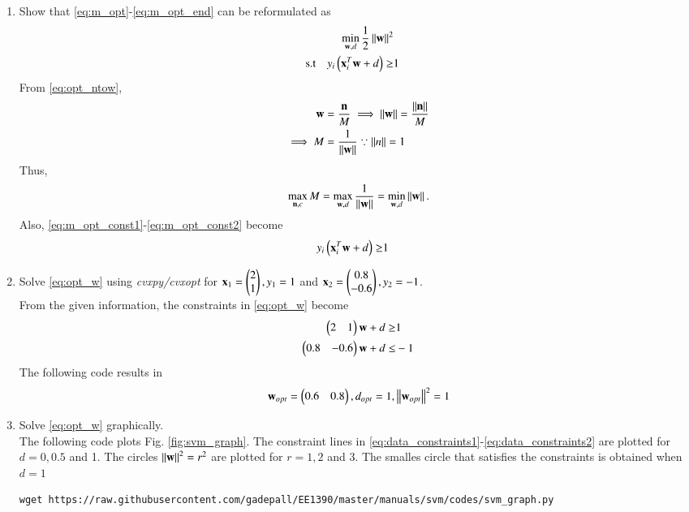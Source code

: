 \documentclass[journal,12pt,twocolumn]{IEEEtran}
\renewcommand\thesection{\arabic{section}}
\begin{document}
\begin{enumerate}[label=\thesection.\arabic*,ref=\thesection.\theenumi]
\item Show that \eqref{eq:m_opt}-\eqref{eq:m_opt_end} can be reformulated as
%
\begin{align}
\label{eq:opt_w}
\min_{\mathbf{w},d}\frac{1}{2}\left\Vert\mathbf{w}\right\Vert^2
\\
\text{s.t} \quad  y_i\left(\mathbf{x}_i^T\mathbf{w}+d\right) \ge&1
\end{align}
\solution From \eqref{eq:opt_ntow},
\begin{align}
\mathbf{w} &= \frac{\mathbf{n}}{M} \implies 
 \left\Vert\mathbf{w}\right\Vert = \frac{\left\Vert\mathbf{n}\right\Vert}{M} 
\\
\implies M &= \frac{1}{\left\Vert\mathbf{w}\right\Vert} \because \left\Vert n\right\Vert = 1
\end{align}
Thus, 
\begin{align}
\max_{\mathbf{n},c}M = \max_{\mathbf{w},d}\frac{1}{\left\Vert\mathbf{w}\right\Vert}=\min_{\mathbf{w},d}\left\Vert\mathbf{w}\right\Vert.
\end{align}
Also, \eqref{eq:m_opt_const1}-\eqref{eq:m_opt_const2} become
\begin{align}
y_i\left(\mathbf{x}_i^T\mathbf{w}+d\right) \ge&1
\end{align}
%
\item Solve \eqref{eq:opt_w} using {\em cvxpy/cvxopt} for $\mathbf{x}_1=\begin{pmatrix}2 \\ 1\end{pmatrix},y_1=1$ and 
$\mathbf{x}_2=\begin{pmatrix}0.8 \\ -0.6\end{pmatrix},y_2=-1$.
\\
\solution  From the given information, the constraints in \eqref{eq:opt_w} become
\begin{align}
\label{eq:data_constraints1}
\begin{pmatrix}2 & 1\end{pmatrix}\mathbf{w}+d \ge&1
\\
\begin{pmatrix}0.8 & -0.6\end{pmatrix}\mathbf{w}+d \le&-1
\label{eq:data_constraints2}
\end{align}
%
The following code results in 
\begin{align}
\mathbf{w}_{opt} = \begin{pmatrix}0.6 & 0.8\end{pmatrix}, d_{opt} = 1, 
\left\Vert\mathbf{w}_{opt}\right\Vert^2 = 1
\end{align}

\item Solve \eqref{eq:opt_w} 
 graphically.
\\
\solution The following code plots Fig. \ref{fig:svm_graph}.  The 
constraint lines in \eqref{eq:data_constraints1}-\eqref{eq:data_constraints2} are plotted for $d = 0, 
0.5$ 
and 1.  The circles $\left\Vert\mathbf{w}\right\Vert^2 = r^2$ are plotted for $r = 1,2$ and 
3. The smalles circle that satisfies the constraints is obtained when $d = 
1$
\begin{lstlisting}
wget https://raw.githubusercontent.com/gadepall/EE1390/master/manuals/svm/codes/svm_graph.py

\end{lstlisting}
\end{enumerate}
\end{document}

